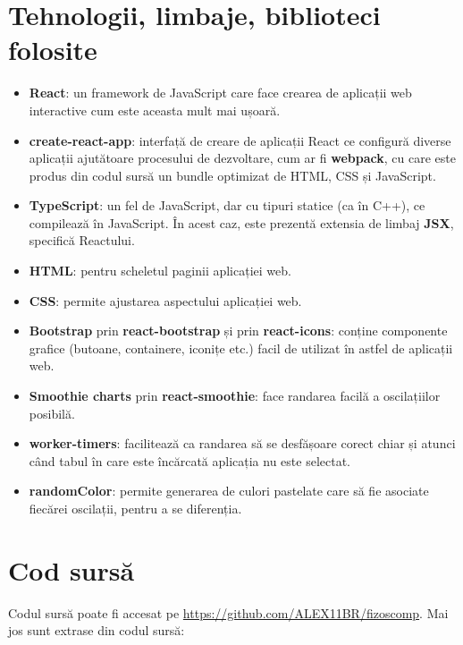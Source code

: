 \documentclass[numbers=endperiod]{scrreprt}
\begin{document}
\chapter{Tehnologii, limbaje, biblioteci folosite}
\begin{itemize}
	\item \textbf{React}: un framework de JavaScript care face crearea de aplicații web interactive cum este aceasta mult mai ușoară.
	\item \textbf{create-react-app}: interfață de creare de aplicații React ce configură diverse aplicații ajutătoare procesului de dezvoltare, cum ar fi \textbf{webpack}, cu care este produs din codul sursă un bundle optimizat de HTML, CSS și JavaScript.
	\item \textbf{TypeScript}: un fel de JavaScript, dar cu tipuri statice (ca în C++), ce compilează în JavaScript. În acest caz, este prezentă extensia de limbaj \textbf{JSX}, specifică Reactului.
	\item \textbf{HTML}: pentru scheletul paginii aplicației web.
	\item \textbf{CSS}: permite ajustarea aspectului aplicației web.
	\item \textbf{Bootstrap} prin \textbf{react-bootstrap} și prin \textbf{react-icons}: conține componente grafice (butoane, containere, iconițe etc.) facil de utilizat în astfel de aplicații web.
	\item \textbf{Smoothie charts} prin \textbf{react-smoothie}: face randarea facilă a oscilațiilor posibilă.
	\item \textbf{worker-timers}: facilitează ca randarea să se desfășoare corect chiar și atunci când tabul în care este încărcată aplicația nu este selectat.
	\item \textbf{randomColor}: permite generarea de culori pastelate care să fie asociate fiecărei oscilații, pentru a se diferenția.
\end{itemize}
\chapter{Cod sursă}
Codul sursă poate fi accesat pe \url{https://github.com/ALEX11BR/fizoscomp}. Mai jos sunt extrase din codul sursă:
\end{document}
